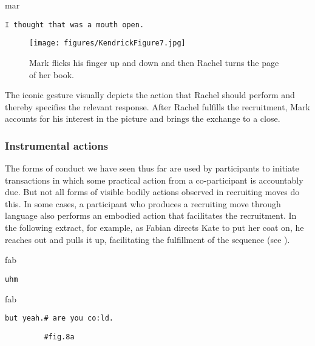 \documentclass[output=paper,nonflat,modfont,draft]{langsci/langscibook}
\begin{document}

\begin{transbox}{11}{mar}
\begin{verbatim}
I thought that was a mouth open.
\end{verbatim}
\end{transbox}\bigskip

\begin{figure}
\caption{Mark flicks his finger up and down and then Rachel turns the page of her book.}
\texttt{[image: figures/KendrickFigure7.jpg]}
\label{fig:kendrick:7}
\end{figure}

The iconic gesture visually depicts the action that Rachel should perform and thereby specifies the relevant response. After Rachel fulfills the recruitment, Mark accounts for his interest in the picture and brings the exchange to a close.

\subsubsection{Instrumental actions}
The forms of conduct we have seen thus far are used by participants to initiate transactions in which some practical action from a co-participant is accountably due. But not all forms of visible bodily actions observed in recruiting moves do this. In some cases, a participant who produces a recruiting move through language also performs an embodied action that facilitates the recruitment. In the following extract, for example, as Fabian directs Kate to put her coat on, he reaches out and pulls it up, facilitating the fulfillment of the sequence (see ).


\begin{transbox}{1}{fab}
\begin{verbatim}
uhm
\end{verbatim}
\end{transbox}


\begin{transbox}{3}{fab}
\begin{verbatim}
but yeah.# are you co:ld.
\end{verbatim}
\end{transbox}

\begin{transbox}{4}{\fig}
\begin{verbatim}
         #fig.8a
\end{verbatim}
\end{transbox}
\end{document}
